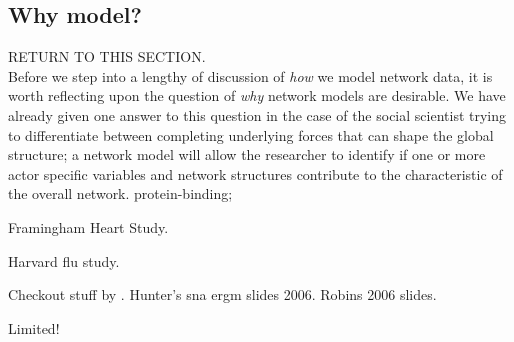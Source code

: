 \subsection{Why model?}
RETURN TO THIS SECTION.\\
Before we step into a lengthy of discussion of \emph{how} we model network data, it is 
worth reflecting upon the question of \emph{why} network models are desirable.  We 
have already given one answer to this question in the case of the social scientist 
trying 
to differentiate between completing underlying forces that can shape the global 
structure; a network model will allow the researcher to identify if one or more actor 
specific variables and network structures contribute to the characteristic of the 
overall network.
protein-binding;

Framingham Heart Study.

Harvard flu study.

Checkout stuff by \citet*{Kolaczyk:slides,Goldenberg:2009,Goodreau:2009}.  Hunter's sna ergm slides 2006.
Robins 2006 slides.

Limited!


%




